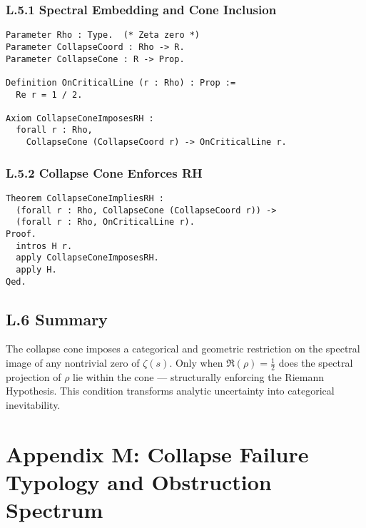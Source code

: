 \documentclass[11pt]{article}
\begin{document}
\subsubsection*{L.5.1 Spectral Embedding and Cone Inclusion}

\begin{lstlisting}[language=Coq, caption=Collapse Cone Constraint, captionpos=b]
Parameter Rho : Type.  (* Zeta zero *)
Parameter CollapseCoord : Rho -> R.
Parameter CollapseCone : R -> Prop.

Definition OnCriticalLine (r : Rho) : Prop :=
  Re r = 1 / 2.

Axiom CollapseConeImposesRH :
  forall r : Rho,
    CollapseCone (CollapseCoord r) -> OnCriticalLine r.
\end{lstlisting}

\subsubsection*{L.5.2 Collapse Cone Enforces RH}

\begin{lstlisting}[language=Coq, caption=Collapse Cone Implies RH, captionpos=b]
Theorem CollapseConeImpliesRH :
  (forall r : Rho, CollapseCone (CollapseCoord r)) ->
  (forall r : Rho, OnCriticalLine r).
Proof.
  intros H r.
  apply CollapseConeImposesRH.
  apply H.
Qed.
\end{lstlisting}

\subsection*{L.6 Summary}

The collapse cone imposes a categorical and geometric restriction on the spectral image of any nontrivial zero of \( \zeta(s) \). Only when \( \Re(\rho) = \tfrac{1}{2} \) does the spectral projection of \( \rho \) lie within the cone — structurally enforcing the Riemann Hypothesis. This condition transforms analytic uncertainty into categorical inevitability.



\appendix
\section*{Appendix M: Collapse Failure Typology and Obstruction Spectrum}
\end{document}
